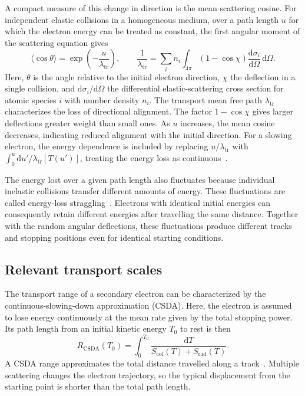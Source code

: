 A compact measure of this change in direction is the mean scattering cosine. For independent elastic collisions in a homogeneous medium, over a path length $u$ for which the electron energy can be treated as constant, the first angular moment of the scattering equation gives
\begin{equation}
  \langle\cos\theta\rangle=\exp\!\left(-\frac{u}{\lambda_{\mathrm{tr}}}\right),
  \qquad
  \frac{1}{\lambda_{\mathrm{tr}}}
  =\sum_i n_i\int_{4\pi}(1-\cos\chi)
  \frac{\mathrm{d}\sigma_i}{\mathrm{d}\Omega}\,\mathrm{d}\Omega.
\end{equation}
Here, $\theta$ is the angle relative to the initial electron direction, $\chi$ the deflection in a single collision, and $\mathrm{d}\sigma_i/\mathrm{d}\Omega$ the differential elastic-scattering cross section for atomic species $i$ with number density $n_i$. The transport mean free path $\lambda_{\mathrm{tr}}$ characterizes the loss of directional alignment. The factor $1-\cos\chi$ gives larger deflections greater weight than small ones. As $u$ increases, the mean cosine decreases, indicating reduced alignment with the initial direction. For a slowing electron, the energy dependence is included by replacing $u/\lambda_{\mathrm{tr}}$ with $\int_0^u\mathrm{d}u'/\lambda_{\mathrm{tr}}[T(u')]$, treating the energy loss as continuous~\parencite[sections II--III]{lewis1950multiple}.

The energy lost over a given path length also fluctuates because individual inelastic collisions transfer different amounts of energy. These fluctuations are called energy-loss straggling~\parencite[sections II.A.3 and II.C]{seltzer1974transmission}. Electrons with identical initial energies can consequently retain different energies after travelling the same distance. Together with the random angular deflections, these fluctuations produce different tracks and stopping positions even for identical starting conditions.

\subsection{Relevant transport scales}

The transport range of a secondary electron can be characterized by the continuous-slowing-down approximation (CSDA). Here, the electron is assumed to lose energy continuously at the mean rate given by the total stopping power. Its path length from an initial kinetic energy $T_0$ to rest is then
\begin{equation}
  R_{\mathrm{CSDA}}(T_0)=\int_0^{T_0}\frac{\mathrm{d}T}{S_{\mathrm{col}}(T)+S_{\mathrm{rad}}(T)}.
\end{equation}
A CSDA range approximates the total distance travelled along a track~\parencite[section 10]{berger1983ranges}. Multiple scattering changes the electron trajectory, so the typical displacement from the starting point is shorter than the total path length.


